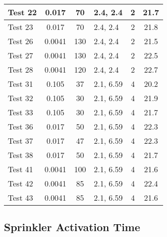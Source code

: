 \begin{table}[!ht]
\begin{center}
\begin{tabular}{|l|c|c|l|c|c|}
Test 22    &  0.017            &  70                 &  2.4, 2.4   &  2              &  21.7                  \\ \hline
Test 23    &  0.017            &  70                 &  2.4, 2.4   &  2              &  21.8                  \\ \hline
Test 26    &  0.0041           &  130                &  2.4, 2.4   &  2              &  21.5                  \\ \hline
Test 27    &  0.0041           &  130                &  2.4, 2.4   &  2              &  22.5                  \\ \hline
Test 28    &  0.0041           &  120                &  2.4, 2.4   &  2              &  22.7                  \\ \hline
Test 31    &  0.105            &  37                 &  2.1, 6.59  &  4              &  20.2                  \\ \hline
Test 32    &  0.105            &  30                 &  2.1, 6.59  &  4              &  21.9                  \\ \hline
Test 33    &  0.105            &  30                 &  2.1, 6.59  &  4              &  21.7                  \\ \hline
Test 36    &  0.017            &  50                 &  2.1, 6.59  &  4              &  22.3                  \\ \hline
Test 37    &  0.017            &  47                 &  2.1, 6.59  &  4              &  22.3                  \\ \hline
Test 38    &  0.017            &  50                 &  2.1, 6.59  &  4              &  21.7                  \\ \hline
Test 41    &  0.0041           &  100                &  2.1, 6.59  &  4              &  21.6                  \\ \hline
Test 42    &  0.0041           &  85                 &  2.1, 6.59  &  4              &  22.4                  \\ \hline
Test 43    &  0.0041           &  85                 &  2.1, 6.59  &  4              &  21.6                  \\ \hline
\end{tabular}
\end{center}
\end{table}


\clearpage


\subsection*{Sprinkler Activation Time}

